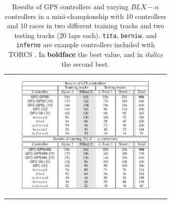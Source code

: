\documentclass[10pt,journal,compsoc]{IEEEtran}
\begin{document}
\begin{table}[h!]
	\centering
	{\scriptsize
		\caption{{\scriptsize Results of GPS controllers and varying $BLX-\alpha$ controllers in a mini-championship with 10 controllers and 10 races in two different training tracks and two testing tracks (20 laps each). {\tt tita}, {\tt berniw}, and {\tt	inferno} are example controllers included with TORCS \cite{torcs4}. In {\bf boldface} the best value, and in {\em italics} the second best.}}
		{
						\begin{tabular}{c}
				\includegraphics[width=8.5cm, height=6.5cm, clip=true, trim=0cm 0cm 0cm 0cm]{fig/table3.pdf} 
%                    
%			
%			
%
%
%

\end{tabular}}}
\end{table}
\end{document}
